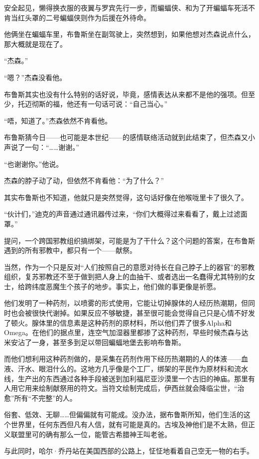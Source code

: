 \documentclass[../main]{subfiles}
\begin{document}
安全起见，懒得换衣服的夜翼与罗宾先行一步，而蝙蝠侠、和为了开蝙蝠车死活不肯当红头罩的二号蝙蝠侠则作为后援在外待命。

他俩坐在蝙蝠车里，布鲁斯坐在副驾驶上，突然想到，如果他想对杰森说点什么，那大概就是现在了。

“杰森。”

“嗯？”杰森没看他。

布鲁斯其实也没有什么特别的话好说，毕竟，感情表达从来都不是他的强项。但至少，托迈彻斯的福，他还有一句话可说：“自己当心。”

“唔，知道了。”杰森依然不肯看他。

布鲁斯猜今日——也可能是本世纪——的感情联络活动就到此结束了，但杰森又小声说了一句：“……谢谢。”

“也谢谢你。”他说。

杰森的脖子动了动，但依然不肯看他：“为了什么？”

其实布鲁斯也不知道，他就只是突然觉得，这句话好像在他喉咙里卡了很久了。

“伙计们，”迪克的声音通过通讯器传过来，“你们大概得过来看看了，戴上过滤面罩。”

提问，一个跨国邪教组织搞绑架，可能是为了干什么？这个问题的答案，在布鲁斯遇到的所有邪教中，都只有一个——献祭。

当然，作为一个只是反对“人们按照自己的意愿对待长在自己脖子上的器官”的邪教组织，复苏邪教还不至于做到把人身上的血抽干、或者选出一名蠢得尤其特别的女士，给跨纬度恶魔生个孩子的地步。事实上，他们做的事更像是祈愿。

他们发明了一种药剂，以喷雾的形式使用，它能让切掉腺体的人经历热潮期，但同时也会被很快代谢掉。如果反应不够敏捷，甚至很可能会觉得自己只是心情不好发了顿火。腺体里的信息素是这种药剂的原材料，所以他们弄了很多Alpha和Omega。在他们的据点里，连空气加湿器里都掺了这种药剂，早些时候杰森与达米安沾了一身，甚至多到足以带回蝙蝠地堡去影响布鲁斯。

而他们想利用这种药剂做的，是采集在药剂作用下经历热潮期的人的体液——血液、汗水、眼泪什么的。这地方几乎像是个工厂，绑架的平民作为原材料和流水线，生产出的东西通过各种手段被送到加利福尼亚沙漠里一个古旧的神庙。那里有人用它用来绘制献祭用的符文。当符文绘制完成后，伊西丝就会降临尘世，“治愈”所有“不完整”的人。

俗套、低效、无聊……但偏偏就有可能成。没办法，据布鲁斯所知，他们生活的这个世界里，任何东西但凡有人信，就有可能是真的。古埃及神他们是不太熟，但正义联盟里可的确有那么一位，能管古希腊神王叫老爸。

与此同时，哈尔·乔丹站在美国西部的公路上，怔怔地看着自己空无一物的右手。
\end{document}
